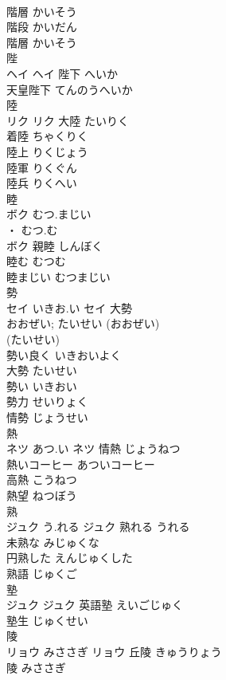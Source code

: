 \documentclass[8pt]{extreport}
\begin{document}
\begin{CJK}{UTF8}{min}
\\	階層	かいそう	
\\	階段	かいだん	
\\	階層	かいそう	
\\	陛	
\\	ヘイ		ヘイ	陛下	へいか	
\\	天皇陛下	てんのうへいか	
\\	陸	
\\	リク		リク	大陸	たいりく	
\\	着陸	ちゃくりく	
\\	陸上	りくじょう	
\\	陸軍	りくぐん	
\\	陸兵	りくへい	
\\	睦	
\\	ボク	むつ.まじい
\\	・ むつ.む
\\	ボク	親睦	しんぼく	
\\	睦む	むつむ	
\\	睦まじい	むつまじい	
\\	勢	
\\	セイ	いきお.い	セイ	大勢 
\\	おおぜい; たいせい	(おおぜい) 
\\	(たいせい) 
\\	勢い良く	いきおいよく	
\\	大勢	たいせい	
\\	勢い	いきおい	
\\	勢力	せいりょく	
\\	情勢	じょうせい	
\\	熱	
\\	ネツ	あつ.い	ネツ	情熱	じょうねつ	
\\	熱いコーヒー	あついコーヒー	
\\	高熱	こうねつ	
\\	熱望	ねつぼう	
\\	熟	
\\	ジュク	う.れる	ジュク	熟れる	うれる	
\\	未熟な	みじゅくな	
\\	円熟した	えんじゅくした	
\\	熟語	じゅくご	
\\	塾	
\\	ジュク		ジュク	英語塾	えいごじゅく	
\\	塾生	じゅくせい	
\\	陵	
\\	リョウ	みささぎ	リョウ	丘陵	きゅうりょう	
\\	陵	みささぎ	

\end{CJK}
\end{document}
